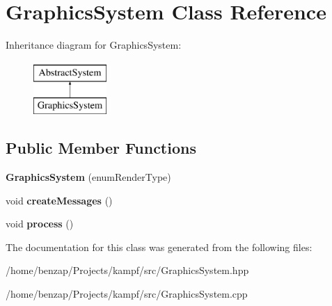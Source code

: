 \hypertarget{classGraphicsSystem}{\section{Graphics\-System Class Reference}
\label{classGraphicsSystem}
}
Inheritance diagram for Graphics\-System\-:\begin{figure}[H]
\begin{center}
\leavevmode
\includegraphics[height=2.000000cm]{classGraphicsSystem}
\end{center}
\end{figure}
\subsection*{Public Member Functions}
\begin{DoxyCompactItemize}
\item 
\hypertarget{classGraphicsSystem_ac62682b967870bfece9ad9d23e29996b}{{\bfseries Graphics\-System} (enum\-Render\-Type)}\label{classGraphicsSystem_ac62682b967870bfece9ad9d23e29996b}

\item 
\hypertarget{classGraphicsSystem_a96162ace89d2a7db3de15d74dd517515}{void {\bfseries create\-Messages} ()}\label{classGraphicsSystem_a96162ace89d2a7db3de15d74dd517515}

\item 
\hypertarget{classGraphicsSystem_ab262d2b993420c2f0abe3917c652995c}{void {\bfseries process} ()}\label{classGraphicsSystem_ab262d2b993420c2f0abe3917c652995c}

\end{DoxyCompactItemize}


The documentation for this class was generated from the following files\-:\begin{DoxyCompactItemize}
\item 
/home/benzap/\-Projects/kampf/src/Graphics\-System.\-hpp\item 
/home/benzap/\-Projects/kampf/src/Graphics\-System.\-cpp\end{DoxyCompactItemize}
